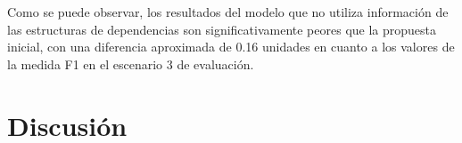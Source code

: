 Como se puede observar, los resultados del modelo que no utiliza información de las estructuras de dependencias son significativamente peores que la propuesta inicial, con una diferencia aproximada de 0.16 unidades en cuanto a los valores de la medida F1 en el escenario 3 de evaluación.


\section{Discusión}
%
